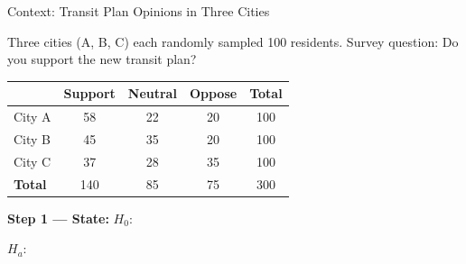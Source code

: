 \documentclass[10pt]{article}
\begin{document}
\begin{notesbox}{Context: Transit Plan Opinions in Three Cities}

Three cities (A, B, C) each randomly sampled 100 residents.
Survey question: Do you support the new transit plan?

\renewcommand{\arraystretch}{1.4}
\begin{center}
\begin{tabular}{@{} l c c c c @{}}
\hline
           & \textbf{Support} & \textbf{Neutral} & \textbf{Oppose} & \textbf{Total} \\
\hline
City A     & 58  & 22  & 20  & 100 \\
City B     & 45  & 35  & 20  & 100 \\
City C     & 37  & 28  & 35  & 100 \\
\hline
\textbf{Total} & 140 & 85 & 75 & 300 \\
\hline
\end{tabular}
\end{center}

\textbf{Step 1 --- State:}
$H_0$: 

$H_a$: 

\end{notesbox}
\end{document}
